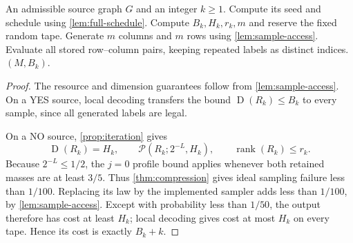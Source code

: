 \documentclass[11pt]{article} \usepackage[utf8]{inputenc}
\theoremstyle{plain} \newtheorem{theorem}{Theorem}[section]
\theoremstyle{definition} \newaliascnt{definition}{theorem}
\newcommand{\D}{\operatorname{D}}
\newcommand{\RP}[3]{\mathcal{P}(#1;#2,#3)}
\DeclareMathOperator{\rank}{rank} \crefname{claim}{Claim}{Claims}
\begin{document}
\begin{algorithm}[H]
\caption{Printing the sampled table and its threshold}
\begin{algorithmic}[1]
\Require An admissible source graph $G$ and an integer $k\ge1$.
\State Compute its seed and schedule using \cref{lem:full-schedule}.
\State Compute $B_k,H_k,r_k,m$ and reserve the fixed random tape.
\State Generate $m$ columns and $m$ rows using \cref{lem:sample-access}.
\State Evaluate all stored row--column pairs, keeping repeated labels as distinct indices.
\State \Return $(M,B_k)$.
\end{algorithmic}
\end{algorithm}

\begin{proof}
The resource and dimension guarantees follow from \cref{lem:sample-access}.
On a YES source, local decoding transfers the bound $\D(R_k)\le B_k$ to
every sample, since all generated labels are legal.

On a NO source, \cref{prop:iteration} gives
\[
\D(R_k)=H_k,\qquad \RP{R_k}{2^{-L}}{H_k},\qquad \rank(R_k)\le r_k.
\]
Because $2^{-L}\le1/2$, the $j=0$ profile bound applies whenever both retained
masses are at least $3/5$. Thus \cref{thm:compression} gives ideal sampling
failure less than $1/100$. Replacing its law by the implemented sampler adds
less than $1/100$, by \cref{lem:sample-access}. Except with probability less
than $1/50$, the output therefore has cost at least $H_k$; local decoding gives
cost at most $H_k$ on every tape. Hence its cost is exactly $B_k+k$.
\end{proof}
\end{document}
